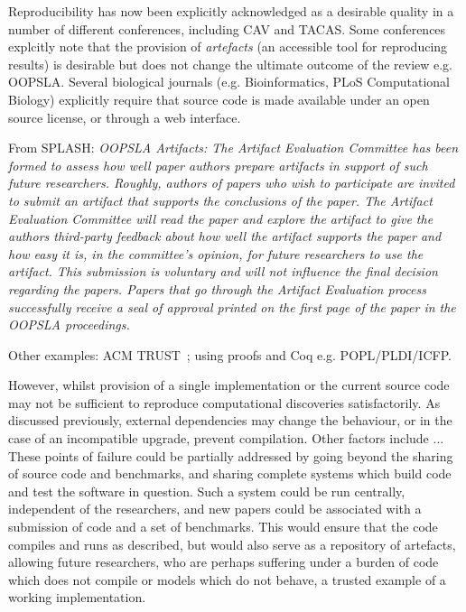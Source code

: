 \documentclass{llncs}
\begin{document}
Reproducibility has now been explicitly acknowledged as a desirable quality in a number of 
different conferences, including CAV and TACAS. Some conferences explcitly note that 
the provision of \emph{artefacts} (an accessible tool for reproducing results) is desirable
but does not change the ultimate outcome of the review e.g. OOPSLA. Several biological journals
(e.g. Bioinformatics, PLoS Computational Biology) explicitly require that source code is
made available under an open source license, or through a web interface. 


From SPLASH: {\emph{OOPSLA Artifacts: The Artifact Evaluation Committee has been formed
to assess how well paper authors prepare artifacts in support of such
future researchers. Roughly, authors of papers who wish to participate
are invited to submit an artifact that supports the conclusions of the
paper. The Artifact Evaluation Committee will read the paper and
explore the artifact to give the authors third-party feedback about
how well the artifact supports the paper and how easy it is, in the
committee’s opinion, for future researchers to use the artifact. This
submission is voluntary and will not influence the final decision
regarding the papers. Papers that go through the Artifact Evaluation
process successfully receive a seal of approval printed on the first
page of the paper in the OOPSLA proceedings.}}

Other examples: ACM TRUST~\cite{fursin+dubach:2014}; using proofs and
Coq e.g. POPL/PLDI/ICFP.


However, whilst provision of a single implementation or the current source
code may not be sufficient to reproduce computational discoveries satisfactorily.
As discussed previously, external dependencies may change the behaviour, or 
in the case of an incompatible upgrade, prevent compilation. Other factors include
... These points of failure could be partially addressed by going beyond the sharing
of source code and benchmarks, and sharing complete systems which build code and 
test the software in question. Such a system could be run centrally, independent of 
the researchers, and new papers could be associated with a submission of code and
a set of benchmarks. This would ensure that the code compiles and runs as described,
but would also serve as a repository of artefacts, allowing future researchers,
who are perhaps suffering under a burden of code which does not compile or models
which do not behave, a trusted example of a working implementation.
\end{document}
